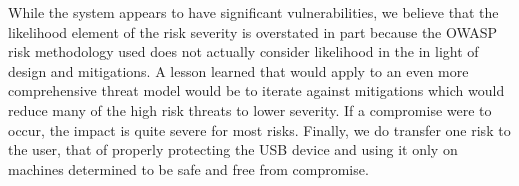 While the system appears to have significant vulnerabilities, we
believe that the likelihood element of the risk severity is overstated
in part because the OWASP risk methodology used does not actually
consider likelihood in the in light of design and mitigations. A
lesson learned that would apply to an even more comprehensive threat
model would be to iterate against mitigations which would reduce many
of the high risk threats to lower severity. If a compromise were to
occur, the impact is quite severe for most risks.  Finally, we do
transfer one risk to the user, that of properly protecting the USB
device and using it only on machines determined to be safe and free
from compromise.
